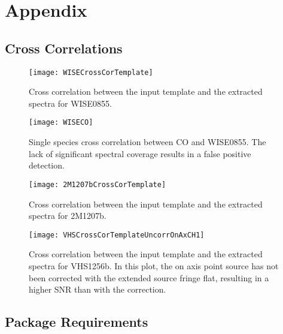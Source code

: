 \appendix
\chapter{Appendix}
\section{Cross Correlations}
\begin{figure}[h]
	\texttt{[image: WISECrossCorTemplate]}
	\caption{Cross correlation between the input template and the extracted spectra for WISE0855.}
\end{figure}
\begin{figure}[h]
	\texttt{[image: WISECO]}
	\caption{Single species cross correlation between CO and WISE0855. The lack of significant spectral coverage results in a false positive detection.}
	\label{fig:wiseco}
\end{figure}
\begin{figure}[h]
	\texttt{[image: 2M1207bCrossCorTemplate]}
	\caption{Cross correlation between the input template and the extracted spectra for 2M1207b.}
\end{figure}
\begin{figure}[h]
	\texttt{[image: VHSCrossCorTemplateUncorrOnAxCH1]}
	\caption{Cross correlation between the input template and the extracted spectra for VHS1256b. In this plot, the on axis point source has not been corrected with the extended source fringe flat, resulting in a higher SNR than with the correction.}
\end{figure}

\clearpage
\section{Package Requirements}

